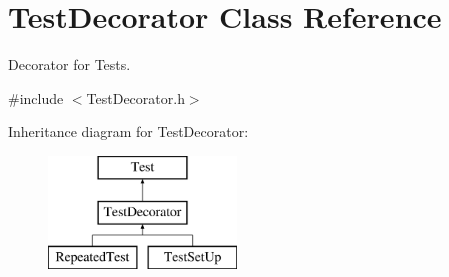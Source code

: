 \hypertarget{class_test_decorator}{\section{Test\-Decorator Class Reference}
\label{class_test_decorator}
}


Decorator for Tests.  




{\ttfamily \#include $<$Test\-Decorator.\-h$>$}

Inheritance diagram for Test\-Decorator\-:\begin{figure}[H]
\begin{center}
\leavevmode
\includegraphics[height=3.000000cm]{class_test_decorator}
\end{center}
\end{figure}
